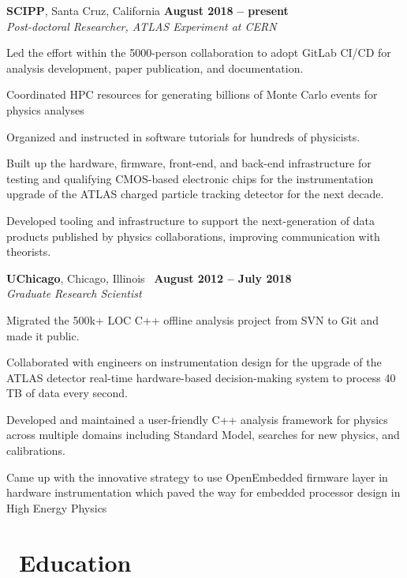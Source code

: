 \documentclass[margin,line]{resume}
\begin{document}
\begin{resume}
\textbf{SCIPP}, Santa Cruz, California \hfill \textbf{August 2018 -- present}\\
\textsl{Post-doctoral Researcher, ATLAS Experiment at CERN}
\begin{list2}
  \item Led the effort within the 5000-person collaboration to adopt GitLab CI/CD for analysis development, paper publication, and documentation.
  \item Coordinated HPC resources for generating billions of Monte Carlo events for physics analyses
  \item Organized and instructed in software tutorials for hundreds of physicists.
  \item Built up the hardware, firmware, front-end, and back-end infrastructure for testing and qualifying CMOS-based electronic chips for the instrumentation upgrade of the ATLAS charged particle tracking detector for the next decade.
  \item Developed tooling and infrastructure to support the next-generation of data products published by physics collaborations, improving communication with theorists.
\end{list2}

\textbf{UChicago}, Chicago, Illinois \hfill \faCalendar\ \textbf{August 2012 -- July 2018}\\
\textsl{Graduate Research Scientist}
\begin{list2}
  \item Migrated the 500k+ LOC C++ offline analysis project from SVN to Git and made it public.
  \item Collaborated with engineers on instrumentation design for the upgrade of the ATLAS detector real-time hardware-based decision-making system to process 40 TB of data every second.
  \item Developed and maintained a user-friendly C++ analysis framework for physics across multiple domains including Standard Model, searches for new physics, and calibrations.
  \item Came up with the innovative strategy to use OpenEmbedded firmware layer in hardware instrumentation which paved the way for embedded processor design in High Energy Physics
\end{list2}

\section{\mysidestyle \faMortarBoard~Education}


\end{resume}
\end{document}
